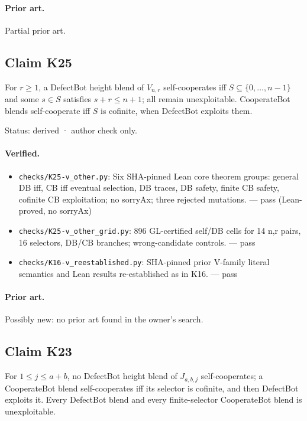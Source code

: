 \documentclass{article}
\begin{document}
\paragraph{Prior art.} Partial prior art.

\subsection*{Claim K25}

For $r\ge1$, a DefectBot height blend of $V_{n,r}$ self-cooperates iff $S\subseteq\{0,\ldots,n-1\}$ and some $s\in S$ satisfies $s+r\le n+1$; all remain unexploitable. CooperateBot blends self-cooperate iff $S$ is cofinite, when DefectBot exploits them.

Status: derived · author check only.

\paragraph{Verified.}
\begin{itemize}
\item \texttt{checks/K25-v\_other.py}: Six SHA-pinned Lean core theorem groups: general DB iff, CB iff eventual selection, DB traces, DB safety, finite CB safety, cofinite CB exploitation; no sorryAx; three rejected mutations. --- pass (Lean-proved, no sorryAx)
\item \texttt{checks/K25-v\_other\_grid.py}: 896 GL-certified self/DB cells for 14 n,r pairs, 16 selectors, DB/CB branches; wrong-candidate controls. --- pass
\item \texttt{checks/K16-v\_reestablished.py}: SHA-pinned prior V-family literal semantics and Lean results re-established as in K16. --- pass
\end{itemize}

\paragraph{Prior art.} Possibly new: no prior art found in the owner's search.

\subsection*{Claim K23}

For $1\le j\le a+b$, no DefectBot height blend of $J_{a,b,j}$ self-cooperates; a CooperateBot blend self-cooperates iff its selector is cofinite, and then DefectBot exploits it. Every DefectBot blend and every finite-selector CooperateBot blend is unexploitable.
\end{document}
